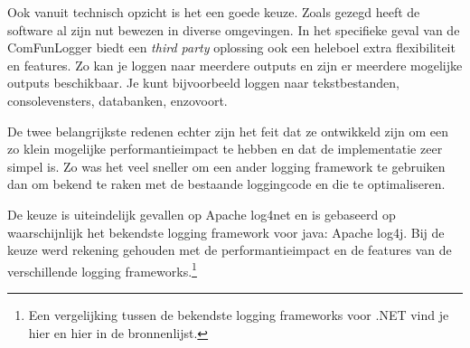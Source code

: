 Ook vanuit technisch opzicht is het een goede keuze.
Zoals gezegd heeft de software al zijn nut bewezen in diverse omgevingen.
In het specifieke geval van de ComFunLogger biedt een \emph{third party} oplossing ook een heleboel
extra flexibiliteit en features. Zo kan je loggen naar meerdere outputs en zijn er meerdere mogelijke outputs beschikbaar.
Je kunt bijvoorbeeld loggen naar tekstbestanden, consolevensters, databanken, enzovoort.

De twee belangrijkste redenen echter zijn het feit dat ze ontwikkeld zijn om een zo klein mogelijke performantieimpact te hebben en
dat de implementatie zeer simpel is.
Zo was het veel sneller om een ander logging framework te gebruiken dan om bekend te raken met de bestaande loggingcode en die te optimaliseren.

De keuze is uiteindelijk gevallen op Apache log4net en is gebaseerd op waarschijnlijk het bekendste logging framework voor java: Apache log4j.
Bij de keuze werd rekening gehouden met de performantieimpact en de features van de verschillende logging frameworks.\footnote{
	Een vergelijking tussen de bekendste logging frameworks voor .NET vind je hier\cite{logging-frameworks-and-performance} en
	hier\cite{logging-frameworks} in de bronnenlijst.}








